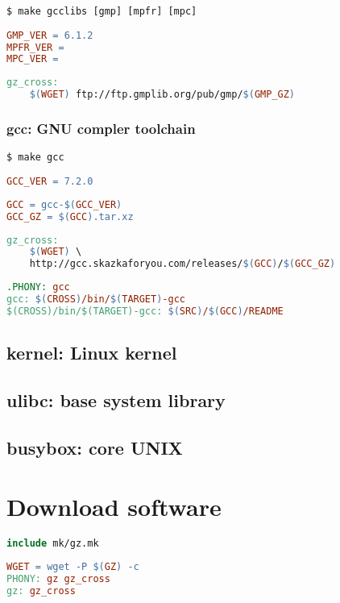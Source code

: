 \begin{lstlisting}
$ make gcclibs [gmp] [mpfr] [mpc]
\end{lstlisting}
\begin{lstlisting}[language=make,title=mk/version]
GMP_VER = 6.1.2
MPFR_VER =
MPC_VER = 
\end{lstlisting}
\begin{lstlisting}[language=make,title=mk/gz]
gz_cross:
	$(WGET) ftp://ftp.gmplib.org/pub/gmp/$(GMP_GZ)
\end{lstlisting}

\subsubsection{gcc: GNU compler toolchain}

\begin{lstlisting}
$ make gcc
\end{lstlisting}
\begin{lstlisting}[language=make,title=mk/version]
GCC_VER = 7.2.0
\end{lstlisting}
\begin{lstlisting}[language=make,title=mk/package]
GCC = gcc-$(GCC_VER)
GCC_GZ = $(GCC).tar.xz
\end{lstlisting}
\begin{lstlisting}[language=make,title=mk/gz]
gz_cross:
	$(WGET) \
	http://gcc.skazkaforyou.com/releases/$(GCC)/$(GCC_GZ)
\end{lstlisting}
\begin{lstlisting}[language=make,title=mk/cross]
.PHONY: gcc
gcc: $(CROSS)/bin/$(TARGET)-gcc
$(CROSS)/bin/$(TARGET)-gcc: $(SRC)/$(GCC)/README
\end{lstlisting}

\subsection{kernel: Linux kernel}

\subsection{ulibc: base system library}

\subsection{busybox: core UNIX}

\section{Download software}

\begin{lstlisting}[language=make,title=Makefile]
include mk/gz.mk
\end{lstlisting}

\begin{lstlisting}[language=make,title=mk/gz]
WGET = wget -P $(GZ) -c	
PHONY: gz gz_cross
gz: gz_cross
\end{lstlisting}
